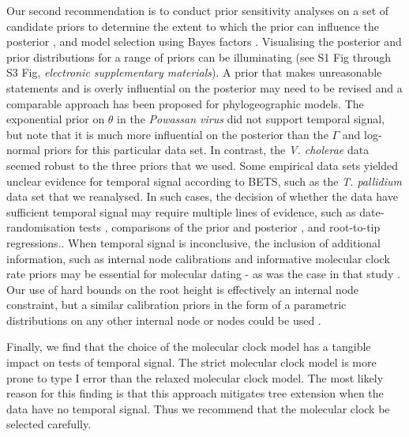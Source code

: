 \documentclass[10pt,letterpaper]{article}
\begin{document}
Our second recommendation is to conduct prior sensitivity analyses on a set of candidate priors to determine the extent to which the prior can influence the posterior \cite{foster2017evaluating, lopes2011confronting}, and model selection using Bayes factors \cite{lambert2018student}. Visualising the posterior and prior distributions for a range of priors can be illuminating (see S1 Fig through S3 Fig, \textit{electronic supplementary materials}). A prior that makes unreasonable statements and is overly influential on the posterior may need to be revised {and a comparable approach has been proposed for phylogeographic models\cite{gao2023model, gao2023prioritree}}. The exponential prior on $\theta$ in the \textit{Powassan virus} did not support temporal signal, but note that it is much more influential on the posterior than the $\Gamma$ and log-normal priors for this particular data set. In contrast, the \textit{V. cholerae} data seemed robust to the three priors that we used. Some empirical data sets yielded unclear evidence for temporal signal according to BETS, such as the \textit{T. pallidium} data set that we reanalysed. In such cases, the decision of whether the data have sufficient temporal signal may require multiple lines of evidence, such as date-randomisation tests \cite{duchene2015performance, ramsden2009hantavirus}, comparisons of the prior and posterior \cite{duchene2020estimating}, and root-to-tip regressions.\cite{featherstone2023clockor2, rambaut2016exploring}. When temporal signal is inconclusive, the inclusion of additional information, such as internal node calibrations and informative molecular clock rate priors may be essential for molecular dating - as was the case in that study \cite{majander2020ancient}. {Our use of hard bounds on the root height is effectively an internal node constraint, but a similar calibration priors in the form of a parametric distributions on any other internal node or nodes could be used \cite{duchene2014impact, warnock2015calibration}.}

Finally, we find that the choice of the molecular clock model has a tangible impact on tests of temporal signal. The strict molecular clock model is more prone to type I error than the relaxed molecular clock model. The most likely reason for this finding is that this approach mitigates tree extension when the data have no temporal signal. Thus we recommend that the molecular clock be selected carefully.

\end{document}
